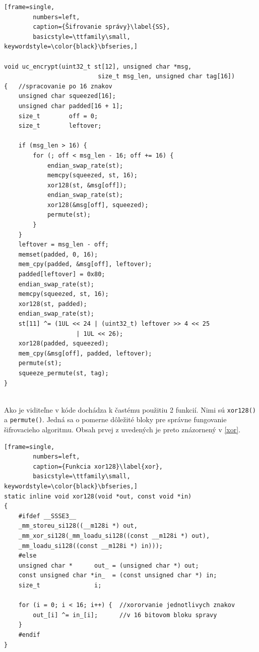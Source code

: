 \begin{minipage}{\linewidth} 	
	\begin{lstlisting}[frame=single,
		numbers=left,
		caption={Šifrovanie správy}\label{SS},
		basicstyle=\ttfamily\small, keywordstyle=\color{black}\bfseries,]
 		
void uc_encrypt(uint32_t st[12], unsigned char *msg, 
					      size_t msg_len, unsigned char tag[16])
{	//spracovanie po 16 znakov
	unsigned char squeezed[16];
	unsigned char padded[16 + 1];
	size_t        off = 0;
	size_t        leftover;
	
	if (msg_len > 16) {
		for (; off < msg_len - 16; off += 16) {
			endian_swap_rate(st);
			memcpy(squeezed, st, 16);
			xor128(st, &msg[off]);
			endian_swap_rate(st);
			xor128(&msg[off], squeezed);
			permute(st);
		}
	}
	leftover = msg_len - off;
	memset(padded, 0, 16);
	mem_cpy(padded, &msg[off], leftover);
	padded[leftover] = 0x80;
	endian_swap_rate(st);
	memcpy(squeezed, st, 16);
	xor128(st, padded);
	endian_swap_rate(st);
	st[11] ^= (1UL << 24 | (uint32_t) leftover >> 4 << 25
				    | 1UL << 26); 
	xor128(padded, squeezed);
	mem_cpy(&msg[off], padded, leftover);
	permute(st);
	squeeze_permute(st, tag);
}
  	\end{lstlisting}
\end{minipage}\\ 

Ako je viditeľne v kóde dochádza k častému použitiu 2 funkcií. Nimi sú  \lstinline|xor128()| a  \lstinline|permute()|. Jedná sa o pomerne dôležité bloky pre správne fungovanie šifrovacieho algoritmu. Obsah prvej z uvedených je preto znázornený v \ref{xor}.

\begin{minipage}{\linewidth} 	
	\begin{lstlisting}[frame=single,
		numbers=left,
		caption={Funkcia xor128}\label{xor},
		basicstyle=\ttfamily\small, keywordstyle=\color{black}\bfseries,]
static inline void xor128(void *out, const void *in)
{
	#ifdef __SSSE3__
	_mm_storeu_si128((__m128i *) out,
	_mm_xor_si128(_mm_loadu_si128((const __m128i *) out),
	_mm_loadu_si128((const __m128i *) in)));
	#else
	unsigned char *      out_ = (unsigned char *) out;
	const unsigned char *in_  = (const unsigned char *) in;
	size_t               i;
	
	for (i = 0; i < 16; i++) {	//xororvanie jednotlivych znakov 
		out_[i] ^= in_[i];		//v 16 bitovom bloku spravy
	}
	#endif
}
  	\end{lstlisting}
\end{minipage}\\ 

